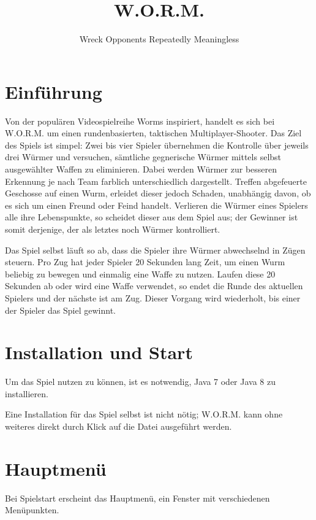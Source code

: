 \documentclass{scrreprt}
\title{W.O.R.M.}
\author{Wreck Opponents Repeatedly Meaningless}
\begin{document}
 
\maketitle
\tableofcontents
\thispagestyle{empty}
\newpage
\setcounter{page}{3}

\chapter{Einführung}
Von der populären Videospielreihe Worms inspiriert, handelt es sich bei W.O.R.M. um einen rundenbasierten, taktischen Multiplayer-Shooter. Das Ziel des Spiels ist simpel:
Zwei bis vier Spieler übernehmen die Kontrolle über jeweils drei Würmer und versuchen, sämtliche gegnerische Würmer mittels selbst ausgewählter Waffen zu eliminieren. Dabei werden Würmer zur besseren Erkennung je nach Team farblich unterschiedlich dargestellt. Treffen abgefeuerte Geschosse auf einen Wurm, erleidet dieser jedoch Schaden, unabhängig davon, ob es sich um einen Freund oder Feind handelt.
Verlieren die Würmer eines Spielers alle ihre Lebenspunkte, so scheidet dieser aus dem Spiel aus; der Gewinner ist somit derjenige, der als letztes noch Würmer kontrolliert.

Das Spiel selbst läuft so ab, dass die Spieler ihre Würmer abwechselnd in Zügen steuern. Pro Zug hat jeder Spieler 20 Sekunden lang Zeit, um einen Wurm beliebig zu bewegen und einmalig eine Waffe zu nutzen. Laufen diese 20 Sekunden ab oder wird eine Waffe verwendet, so endet die Runde des aktuellen Spielers und der nächste ist am Zug. Dieser Vorgang wird wiederholt, bis einer der Spieler das Spiel gewinnt.

\chapter{Installation und Start}
Um das Spiel nutzen zu können, ist es notwendig, Java 7 oder Java 8 zu installieren.

Eine Installation für das Spiel selbst ist nicht nötig; W.O.R.M. kann ohne weiteres direkt durch Klick auf die Datei ausgeführt werden.

\chapter{Hauptmenü}
Bei Spielstart erscheint das Hauptmenü, ein Fenster mit verschiedenen Menüpunkten.
\end{document}
